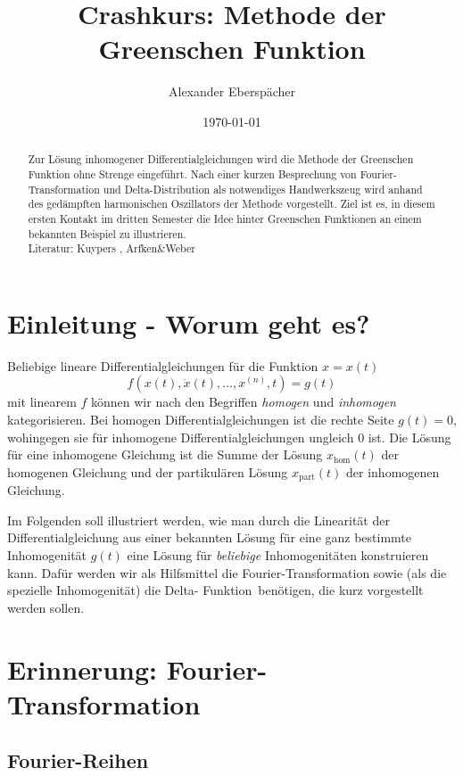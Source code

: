 \documentclass[paper=a4, fontsize=11.0pt, abstractoff, DIV12]{scrartcl}
\title{Crashkurs: Methode der Greenschen Funktion}
\author{Alexander Eberspächer}
\date{\today}
\newcommand{\xhom}{\ensuremath{x_\mathrm{hom}}}
\newcommand{\xinhom}{\ensuremath{x_\mathrm{part}}}
\begin{document}
 \maketitle \begin{abstract} Zur Lösung inhomogener
Differentialgleichungen wird die Methode der Greenschen Funktion ohne
Strenge eingeführt. Nach einer kurzen Besprechung von
Fourier-Transformation und Delta-Distribution als notwendiges Handwerkszeug
wird anhand des gedämpften harmonischen Oszillators der Methode vorgestellt.
Ziel ist es, in diesem ersten Kontakt im dritten Semester die Idee hinter
Greenschen Funktionen an einem bekannten Beispiel zu illustrieren.\\[0.5ex]
Literatur: Kuypers \cite{Kuypers}, Arfken\&Weber \cite{Arfken}
\end{abstract}


\section{Einleitung - Worum geht es?}

Beliebige lineare Differentialgleichungen für die Funktion $x = x(t)$
\begin{equation}
f\left(x(t), \dot{x}(t), \dots, x^{(n)}, t\right) = g(t)
\end{equation}
mit linearem $f$ können wir nach den Begriffen \emph{homogen} und \emph
{inhomogen} kategorisieren. Bei homogen Differentialgleichungen ist die
rechte Seite $g(t) = 0$, wohingegen sie für inhomogene
Differentialgleichungen ungleich $0$ ist. Die Lösung für eine inhomogene
Gleichung ist die Summe der Lösung $\xhom(t)$ der homogenen Gleichung und
der partikulären Lösung $\xinhom(t)$ der inhomogenen Gleichung.

Im Folgenden soll illustriert werden, wie man durch die Linearität der
Differentialgleichung aus einer bekannten Lösung für eine ganz bestimmte
Inhomogenität $g(t)$ eine Lösung für \emph{beliebige} Inhomogenitäten
konstruieren kann. Dafür werden wir als Hilfsmittel die
Fourier-Transformation sowie (als die spezielle Inhomogenität) die Delta-
\glqq Funktion\grqq~benötigen, die kurz vorgestellt werden sollen.

\section{Erinnerung: Fourier-Transformation}

\subsection{Fourier-Reihen}
\end{document}
